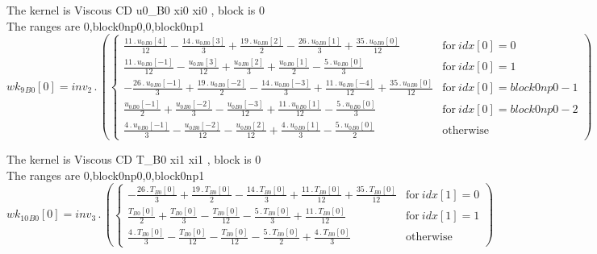 \documentclass{article}
\begin{document}
\noindent The kernel is Viscous CD u0_B0 xi0 xi0 , block is 0\\\noindent The ranges are 0,block0np0,0,block0np1\\\begin{dmath}{wk_{9}{_{B0}}}[{0}] = inv_2 \,.\, \left(\begin{cases} \frac{11 \,.\, {u_{0}{_{B0}}}[{4}]}{12} - \frac{14 \,.\, {u_{0}{_{B0}}}[{3}]}{3} + \frac{19 \,.\, {u_{0}{_{B0}}}[{2}]}{2} - \frac{26 \,.\, {u_{0}{_{B0}}}[{1}]}{3} + \frac{35 \,.\, 
{u_{0}{_{B0}}}[{0}]}{12} & \text{for}\: {idx}[{0}] = 0 \\\frac{11 \,.\, {u_{0}{_{B0}}}[{-1}]}{12} - \frac{{u_{0}{_{B0}}}[{3}]}{12} + \frac{{u_{0}{_{B0}}}[{2}]}{3} + \frac{{u_{0}{_{B0}}}[{1}]}{2} - \frac{5 \,.\, {u_{0}{_{B0}}}[{0}]}{3} & \text{for}\: 
{idx}[{0}] = 1 \\- \frac{26 \,.\, {u_{0}{_{B0}}}[{-1}]}{3} + \frac{19 \,.\, {u_{0}{_{B0}}}[{-2}]}{2} - \frac{14 \,.\, {u_{0}{_{B0}}}[{-3}]}{3} + \frac{11 \,.\, {u_{0}{_{B0}}}[{-4}]}{12} + \frac{35 \,.\, {u_{0}{_{B0}}}[{0}]}{12} & \text{for}\: 
{idx}[{0}] = block0np0 - 1 \\\frac{{u_{0}{_{B0}}}[{-1}]}{2} + \frac{{u_{0}{_{B0}}}[{-2}]}{3} - \frac{{u_{0}{_{B0}}}[{-3}]}{12} + \frac{11 \,.\, {u_{0}{_{B0}}}[{1}]}{12} - \frac{5 \,.\, {u_{0}{_{B0}}}[{0}]}{3} & \text{for}\: {idx}[{0}] = block0np0 - 2 
\\\frac{4 \,.\, {u_{0}{_{B0}}}[{-1}]}{3} - \frac{{u_{0}{_{B0}}}[{-2}]}{12} - \frac{{u_{0}{_{B0}}}[{2}]}{12} + \frac{4 \,.\, {u_{0}{_{B0}}}[{1}]}{3} - \frac{5 \,.\, {u_{0}{_{B0}}}[{0}]}{2} & \text{otherwise} \end{cases}\right)\end{dmath}

\noindent The kernel is Viscous CD T_B0 xi1 xi1 , block is 0\\\noindent The ranges are 0,block0np0,0,block0np1\\\begin{dmath}{wk_{10}{_{B0}}}[{0}] = inv_3 \,.\, \left(\begin{cases} - \frac{26 \,.\, {T{_{B0}}}[{0}]}{3} + \frac{19 \,.\, {T{_{B0}}}[{0}]}{2} - \frac{14 \,.\, {T{_{B0}}}[{0}]}{3} + \frac{11 \,.\, {T{_{B0}}}[{0}]}{12} + \frac{35 \,.\, 
{T{_{B0}}}[{0}]}{12} & \text{for}\: {idx}[{1}] = 0 \\\frac{{T{_{B0}}}[{0}]}{2} + \frac{{T{_{B0}}}[{0}]}{3} - \frac{{T{_{B0}}}[{0}]}{12} - \frac{5 \,.\, {T{_{B0}}}[{0}]}{3} + \frac{11 \,.\, {T{_{B0}}}[{0}]}{12} & \text{for}\: {idx}[{1}] = 1 \\\frac{4 
\,.\, {T{_{B0}}}[{0}]}{3} - \frac{{T{_{B0}}}[{0}]}{12} - \frac{{T{_{B0}}}[{0}]}{12} - \frac{5 \,.\, {T{_{B0}}}[{0}]}{2} + \frac{4 \,.\, {T{_{B0}}}[{0}]}{3} & \text{otherwise} \end{cases}\right)\end{dmath}
\end{document}
